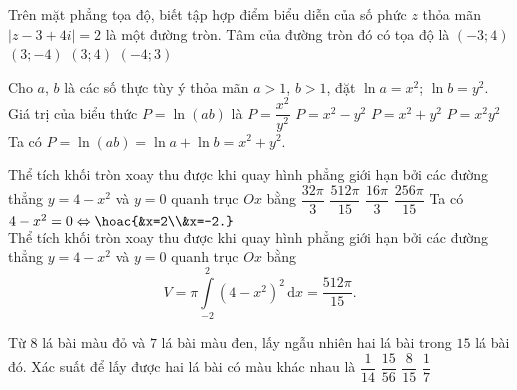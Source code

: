 \begin{ex}%
	Trên mặt phẳng tọa độ, biết tập hợp điểm biểu diễn của số phức $z$ thỏa mãn $|z-3+4i|=2$ là một đường tròn. Tâm của đường tròn đó có tọa độ là
	\choice
	{$(-3;4)$}
	{\True $(3;-4)$}
	{$(3;4)$}
	{$(-4;3)$}
\end{ex}
\begin{ex}%
	Cho $a$, $b$ là các số thực tùy ý thỏa mãn $a>1$, $b>1$, đặt $\ln a=x^2$; $\ln b=y^2$. Giá trị của biểu thức $P=\ln (ab)$ là
	\choice
	{$P=\dfrac{x^2}{y^2}$}
	{$P=x^2-y^2$}
	{\True $P=x^2+y^2$}
	{$P=x^2y^2$}
	\loigiai
	{
	Ta có $P=\ln (ab)=\ln a+\ln b=x^2+y^2$. 
	}
\end{ex}
\begin{ex}%
	Thể tích khối tròn xoay thu được khi quay hình phẳng giới hạn bởi các đường thẳng $y=4-x^2$ và $y=0$ quanh trục $Ox$ bằng
	\choice
	{$\dfrac{32\pi}{3}$}
	{\True $\dfrac{512\pi}{15}$}
	{$\dfrac{16\pi}{3}$}
	{$\dfrac{256\pi}{15}$}
	\loigiai
	{
		Ta có $4-x^2=0\Leftrightarrow \hoac{&x=2\\&x=-2.}$\\
		Thể tích khối tròn xoay thu được khi quay hình phẳng giới hạn bởi các đường thẳng $y=4-x^2$ và $y=0$ quanh trục $Ox$ bằng
		$$V=\pi\displaystyle\int\limits_{-2}^2(4-x^2)^2\mathrm{\,d}x=\dfrac{512\pi}{15}.$$
	}
\end{ex}
\begin{ex}%
	Từ $8$ lá bài màu đỏ và $7$ lá bài màu đen, lấy ngẫu nhiên hai lá bài trong $15$ lá bài đó. Xác suất để lấy được hai lá bài có màu khác nhau là
	\choice
	{$\dfrac{1}{14}$}
	{$\dfrac{15}{56}$}
	{\True $\dfrac{8}{15}$}
	{$\dfrac{1}{7}$}
\end{ex}
